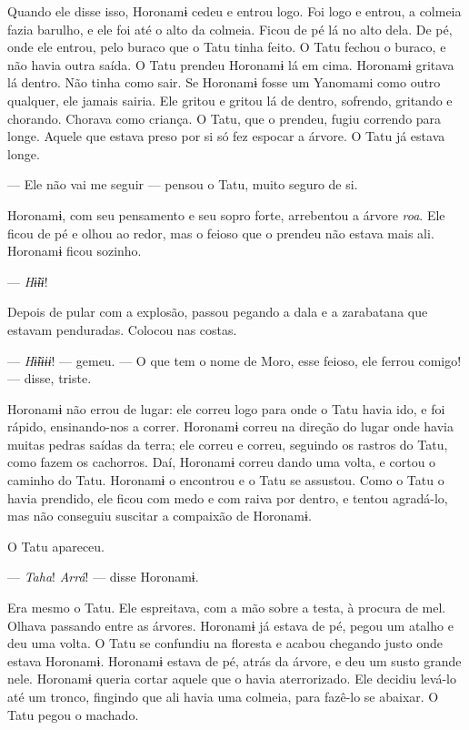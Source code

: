 Quando ele disse isso, Horonamɨ cedeu e entrou logo. Foi logo e entrou,
 a colmeia fazia barulho, e ele foi até o alto da colmeia. Ficou de pé lá
 no alto dela. De pé, onde ele entrou, pelo buraco que o Tatu tinha feito.
 O Tatu fechou o buraco, e não havia outra saída. O Tatu prendeu Horonamɨ
 lá em cima. Horonamɨ gritava lá dentro. Não tinha como sair. Se Horonamɨ
 fosse um Yanomami como outro qualquer, ele jamais sairia. Ele gritou e
 gritou lá de dentro, sofrendo, gritando e chorando. Chorava como
 criança. O Tatu, que o prendeu, fugiu correndo para longe. Aquele que
 estava preso por si só fez espocar a árvore. O Tatu já estava longe. 

--- Ele não vai me seguir --- pensou o Tatu, muito seguro de si. 

Horonamɨ, com seu pensamento e seu sopro forte, arrebentou a
árvore \textit{roa}. Ele ficou de pé e olhou ao redor, mas o feioso que o
prendeu não estava mais ali. Horonamɨ ficou sozinho. 

--- \textit{Hɨ̃ɨɨ}! 

Depois de pular com a explosão, passou pegando a dala e a zarabatana que
estavam penduradas. Colocou nas costas. 

--- \textit{Hɨ̃ɨɨɨɨ}! --- gemeu. --- O que tem o nome de Moro, esse feioso,
ele ferrou comigo! --- disse, triste.

Horonamɨ não errou de lugar: ele correu logo para onde o Tatu havia ido,
 e foi rápido, ensinando-nos a correr. Horonamɨ correu na direção do
 lugar onde havia muitas pedras saídas da terra; ele correu e correu,
 seguindo os rastros do Tatu, como fazem os cachorros. Daí, Horonamɨ
 correu dando uma volta, e cortou o caminho do Tatu. Horonamɨ o
 encontrou e o Tatu se assustou. Como o Tatu o havia prendido, ele ficou
 com medo e com raiva por dentro, e tentou agradá-lo, mas não conseguiu
 suscitar a compaixão de Horonamɨ.

O Tatu apareceu.

--- \textit{Taha}! \textit{Arrá}! --- disse Horonamɨ. 

Era mesmo o Tatu. Ele espreitava, com a mão sobre a testa, à procura de
mel. Olhava passando entre as árvores. Horonamɨ já estava de pé, pegou
um atalho e deu uma volta. O Tatu se confundiu na floresta e acabou
chegando justo onde estava Horonamɨ. Horonamɨ estava de pé, atrás da
árvore, e deu um susto grande nele. Horonamɨ queria cortar aquele que o
havia aterrorizado. Ele decidiu levá-lo até um tronco, fingindo que ali
havia uma colmeia, para fazê-lo se abaixar. O Tatu pegou o machado. 

